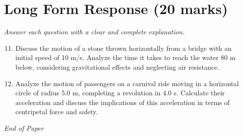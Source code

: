 \documentclass[12pt]{article}
\begin{document}
\section*{Long Form Response (20 marks)}
\textit{Answer each question with a clear and complete explanation.}
\begin{enumerate}[label=\arabic*.]
\setcounter{enumi}{10}
\item Discuss the motion of a stone thrown horizontally from a bridge with an initial speed of 10 m/s. Analyze the time it takes to reach the water 80 m below, considering gravitational effects and neglecting air resistance.
\item Analyze the motion of passengers on a carnival ride moving in a horizontal circle of radius 5.0 m, completing a revolution in 4.0 s. Calculate their acceleration and discuss the implications of this acceleration in terms of centripetal force and safety.
\end{enumerate}

\vfill
\noindent\textit{End of Paper}
\end{document}
